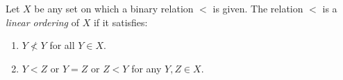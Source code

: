 Let $X$ be any set on which a binary relation $<$ is given. The relation $<$ is a \textit{linear ordering} of $X$ if it satisfies:

\begin{enumerate}
\item[(a)] $Y \not< Y$ for all $Y \in X$.
\item[(b)] $Y < Z$ or $Y = Z$ or $Z < Y$ for any $Y, Z \in X$.
\end{enumerate}
